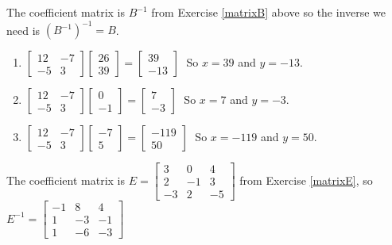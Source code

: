 \documentclass{ximera}
\begin{document}
The coefficient matrix is $B^{-1}$ from Exercise \ref{matrixB} above so the inverse we need is $(B^{-1})^{-1} = B$. 

\begin{enumerate}
\setcounter{enumi}{\value{HW}}

\item $\left[ \begin{array}{rr} 12 & -7 \\ -5 & 3 \end{array} \right] \left[ \begin{array}{r} 26 \\ 39 \end{array} \right] = \left[ \begin{array}{r} 39 \\ -13 \end{array} \right] \;$ So $x = 39$ and $y = -13$.
\item $\left[ \begin{array}{rr} 12 & -7 \\ -5 & 3 \end{array} \right] \left[ \begin{array}{r} 0 \\ -1 \end{array} \right] = \left[ \begin{array}{r} 7 \\ -3 \end{array} \right] \;$ So $x = 7$ and $y = -3$.
\item $\left[ \begin{array}{rr} 12 & -7 \\ -5 & 3 \end{array} \right] \left[ \begin{array}{r} -7 \\ 5 \end{array} \right] = \left[ \begin{array}{r} -119 \\ 50 \end{array} \right] \;$ So $x = -119$ and $y = 50$.

\setcounter{HW}{\value{enumi}}
\end{enumerate}

The coefficient matrix is $E = \left[ \begin{array}{rrr} 3 & 0 & 4 \\ 2 & -1 & 3 \\ -3 & 2 & -5 \end{array} \right]$ from Exercise \ref{matrixE}, so $E^{-1} = \left[ \begin{array}{rrr} -1 & 8 & 4 \\ 1 & -3 & -1 \\ 1 & -6 & -3 \end{array} \right]$ 
\end{document}

